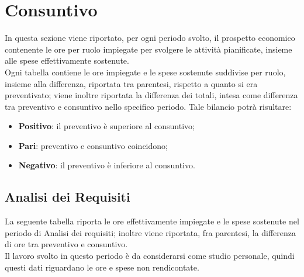 \documentclass[../PianoDiProgetto.tex]{subfiles}
\begin{document}
	\section{Consuntivo}
	In questa sezione viene riportato, per ogni periodo svolto, il prospetto economico contenente le ore per ruolo impiegate per svolgere le attività pianificate, insieme alle spese effettivamente sostenute. \\
	Ogni tabella contiene le ore impiegate e le spese sostenute suddivise per ruolo, insieme alla differenza, riportata tra parentesi, rispetto a quanto si era preventivato; viene inoltre riportata la differenza dei totali, intesa come differenza tra preventivo e consuntivo nello specifico periodo.
	Tale bilancio potrà risultare:
	\begin{itemize}
		\item \textbf{Positivo}: il preventivo è superiore al consuntivo;
		\item \textbf{Pari}: preventivo e consuntivo coincidono;
		\item \textbf{Negativo}: il preventivo è inferiore al consuntivo.
	\end{itemize}

	\subsection{Analisi dei Requisiti}
	La seguente tabella riporta le ore effettivamente impiegate e le spese sostenute nel periodo di Analisi dei requisiti; inoltre viene riportata, fra parentesi, la differenza di ore tra preventivo e consuntivo. \\
	Il lavoro svolto in questo periodo è da considerarsi come studio personale, quindi questi dati riguardano le ore e spese non rendicontate.
\end{document}
